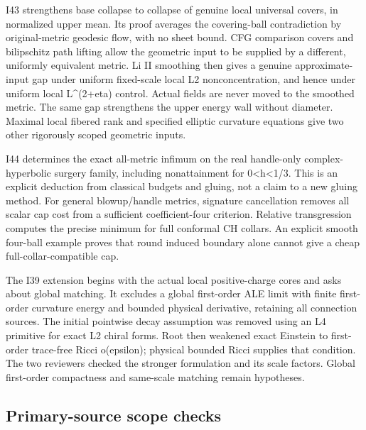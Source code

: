 \documentclass[
  10pt,
]{article}
\begin{document}
I43 strengthens base collapse to collapse of genuine local universal
covers, in normalized upper mean. Its proof averages the covering-ball
contradiction by original-metric geodesic flow, with no sheet bound. CFG
comparison covers and bilipschitz path lifting allow the geometric input
to be supplied by a different, uniformly equivalent metric. Li II
smoothing then gives a genuine approximate-input gap under uniform
fixed-scale local L2 nonconcentration, and hence under uniform local
L\^{}(2+eta) control. Actual fields are never moved to the smoothed
metric. The same gap strengthens the upper energy wall without diameter.
Maximal local fibered rank and specified elliptic curvature equations
give two other rigorously scoped geometric inputs.

I44 determines the exact all-metric infimum on the real handle-only
complex-hyperbolic surgery family, including nonattainment for
0\textless h\textless1/3. This is an explicit deduction from classical
budgets and gluing, not a claim to a new gluing method. For general
blowup/handle metrics, signature cancellation removes all scalar cap
cost from a sufficient coefficient-four criterion. Relative
transgression computes the precise minimum for full conformal CH
collars. An explicit smooth four-ball example proves that round induced
boundary alone cannot give a cheap full-collar-compatible cap.

The I39 extension begins with the actual local positive-charge cores and
asks about global matching. It excludes a global first-order ALE limit
with finite first-order curvature energy and bounded physical
derivative, retaining all connection sources. The initial pointwise
decay assumption was removed using an L4 primitive for exact L2 chiral
forms. Root then weakened exact Einstein to first-order trace-free Ricci
o(epsilon); physical bounded Ricci supplies that condition. The two
reviewers checked the stronger formulation and its scale factors. Global
first-order compactness and same-scale matching remain hypotheses.

\hypertarget{primary-source-scope-checks}{%
\subsection{Primary-source scope
checks}\label{primary-source-scope-checks}}
\end{document}

